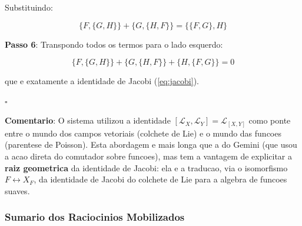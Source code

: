 \documentclass[5p]{elsarticle}
\begin{document}
Substituindo:

\begin{equation}
\{F, \{G,H\}\} + \{G, \{H,F\}\} = \{\{F,G\}, H\}
\end{equation}

\textbf{Passo 6}: Transpondo todos os termos para o lado esquerdo:

\begin{equation}
\{F, \{G,H\}\} + \{G, \{H,F\}\} + \{H, \{F,G\}\} = 0
\end{equation}

que e exatamente a identidade de Jacobi (\ref{eq:jacobi}).

$\square$

\textbf{Comentario}: O sistema utilizou a identidade $[\mathcal{L}_X,
\mathcal{L}_Y] = \mathcal{L}_{[X,Y]}$ como ponte entre o mundo dos
campos vetoriais (colchete de Lie) e o mundo das funcoes (parentese
de Poisson). Esta abordagem e mais longa que a do Gemini (que usou
a acao direta do comutador sobre funcoes), mas tem a vantagem de
explicitar a \textbf{raiz geometrica} da identidade de Jacobi: ela
e a traducao, via o isomorfismo $F \leftrightarrow X_F$, da
identidade de Jacobi do colchete de Lie para a algebra de funcoes
suaves.

\subsubsection*{Sumario dos Raciocinios Mobilizados}
\end{document}
